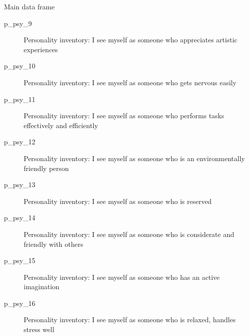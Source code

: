 \begin{Section}{Main data frame}
\begin{description}
\item[p\_psy\_9] Personality inventory: I see myself as someone who appreciates artistic experiences
\item[p\_psy\_10] Personality inventory: I see myself as someone who gets nervous easily
\item[p\_psy\_11] Personality inventory: I see myself as someone who performs tasks effectively and efficiently
\item[p\_psy\_12] Personality inventory: I see myself as someone who is an environmentally friendly person
\item[p\_psy\_13] Personality inventory: I see myself as someone who is reserved
\item[p\_psy\_14] Personality inventory: I see myself as someone who is considerate and friendly with others
\item[p\_psy\_15] Personality inventory: I see myself as someone who has an active imagination
\item[p\_psy\_16] Personality inventory: I see myself as someone who is relaxed, handles stress well

\end{description}

\end{Section}
%
